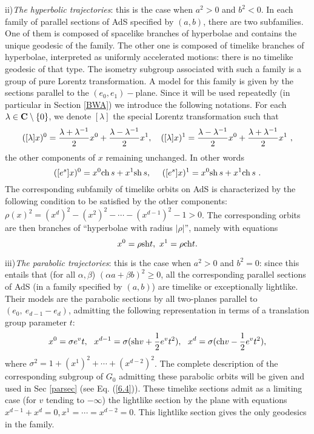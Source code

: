 \documentclass[a4paper,a4paper]{article}
\def\bC{{\bf C}}
\def\ch{{\rm ch\,}}
\def\sh{{\rm sh\,}}
\begin{document}
\vskip 0.2cm
ii){\sl The hyperbolic trajectories}:
this is the case when $a^2 >0$ and $b^2 <0 $.
In each family of parallel sections of AdS specified
by $(a,b)$, there are two subfamilies.
One of them is composed of spacelike branches
of hyperbolae and contains
the unique geodesic of the family. The other one is composed
of timelike branches of hyperbolae, interpreted as
uniformly accelerated motions:
there is no timelike geodesic of that type.
The isometry subgroup associated with such a family is
a group of pure Lorentz transformation.
A model for this family is given by the sections parallel to
the $(e_0,e_1)-$plane. Since it will be used repeatedly
(in particular in Section \ref{BWA}) we introduce the
following notations.
For each $\lambda \in \bC \setminus \{0\}$, we denote $[\lambda]$
the special Lorentz transformation such that
\begin{equation}
([\lambda]x)^0 = {\lambda + \lambda^{-1} \over 2} x^0 +
{\lambda - \lambda^{-1} \over 2} x^1,\ \ \
([\lambda]x)^1 = {\lambda - \lambda^{-1} \over 2} x^0 +
{\lambda + \lambda^{-1} \over 2} x^1\ ,
\label{2.2}\end{equation}
the other components of $x$ remaining unchanged. In other words
\begin{equation}
([e^s]x)^0 = x^0\ch s + x^1\sh s,\ \ \ \
([e^s]x)^1 = x^0\sh s + x^1\ch s\ .
\label{2.3}\end{equation}
The corresponding subfamily of timelike orbits on AdS
is characterized by the following condition to be
satisfied by the other components:
$\rho(x)^2= (x^d)^2 - (x^2)^2 - \cdots -(x^{d-1})^2 -1 > 0$.
The corresponding orbits are then branches of
``hyperbolae with radius $|\rho|$'', namely with
equations
\begin{equation}
x^0 = \rho {\rm sh }t,\
x^1 = \rho {\rm ch} t.
\label{hyperbol}
\end{equation}

\vskip 0.2cm
iii){\sl  The parabolic trajectories}:
this is the case when $a^2 >0$ and $b^2 =0 $: since
this entails that (for all $\alpha,\beta$)
$(\alpha a + \beta b)^2 \ge 0$, all the corresponding
parallel sections of AdS (in a family specified by $(a,b)$)
are timelike or exceptionally lightlike.
Their models are the parabolic sections by all two-planes
parallel to $(e_0,\ e_{d-1} - e_d)$, admitting the following
representation in terms of a translation group parameter $t$:
\begin{equation}
x^0 = \sigma e^v  t,\ \
x^{d-1} = \sigma ({\rm sh} v + {1\over 2}e^v t^2),\ \
x^d = \sigma ({\rm ch} v - {1\over 2}e^v t^2),
\label{parabol}
\end{equation}
where $\sigma^2 = 1 + (x^1)^2 + \cdots + (x^{d-2})^2$.
The complete description of the corresponding subgroup of $G_0$
admitting these parabolic orbits
will be given and used in Sec \ref{parsec} (see Eq. (\ref{6.4})).
These timelike sections admit as a limiting case (for
$v$ tending to $-\infty$) the lightlike section by the plane
with equations $x^{d-1} + x^d = 0, x^1 =\cdots = x^{d-2} =0$.
This lightlike section gives the only geodesics in the family.
\end{document}
